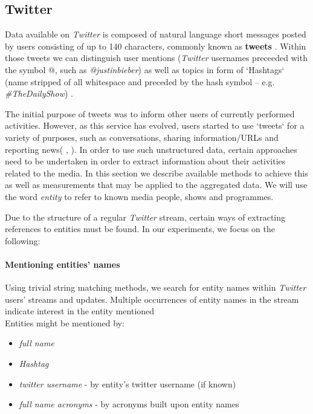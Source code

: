 \subsection{Twitter}

Data available on \textit{Twitter} is composed of natural language short messages posted by users
consisting of up to 140 characters, commonly known as \textbf{tweets} \cite{why-we-twitter}. Within
those tweets we can distinguish user mentions (\textit{Twitter} usernames preceeded with the symbol @,
such as \textit{@justinbieber}) as well as topics in form of `Hashtags` (name stripped of all whitespace
and preceded by the hash symbol -- e.g. \textit{\#TheDailyShow}) \cite{edinburg-corpus}.

The initial purpose of tweets was to inform other users of currently performed activities. However, as this service has
evolved, users started to use `tweets` for a variety of purposes, such as conversations, sharing information/URLs and reporting news(\cite{why-we-twitter} , \cite{twitter-content-is-it}). In order to use such unstructured data,
certain approaches need to be undertaken in order to extract information about their activities related to
the media. In this section we describe available methods to achieve this as well as measurements
that may be applied to the aggregated data. We will use the word \textit{entity} to refer to
known media people, shows and programmes.

Due to the structure of a regular \textit{Twitter} stream, certain ways of extracting references to entities
must be found. In our experiments, we focus on the following:

\paragraph{Mentioning entities' names}
Using trivial string matching methods, we search for entity names within \textit{Twitter} users' streams and updates.
Multiple occurrences of entity names in the stream indicate interest
in the entity mentioned \cite{twitter-content-is-it} \\
Entities might be mentioned by:
\begin{itemize}
  \item \textit{full name}
  \item \textit{Hashtag}
  \item \textit{twitter username} - by entity's twitter username (if known)
  \item \textit{full name acronyms} - by acronyms built upon entity names
\end{itemize}
